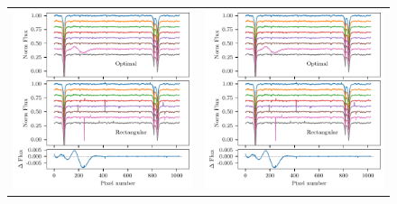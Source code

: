 \begin{figure}
    \centering
    \begin{tabular}{cc}
    \includegraphics[width=\hsize/2]{figures/reduction/Bad_pixel_replacement} &
    \includegraphics[width=\hsize/2]{figures/reduction/Bad_pixel_replacement}\\

\end{tabular}
\end{figure}
